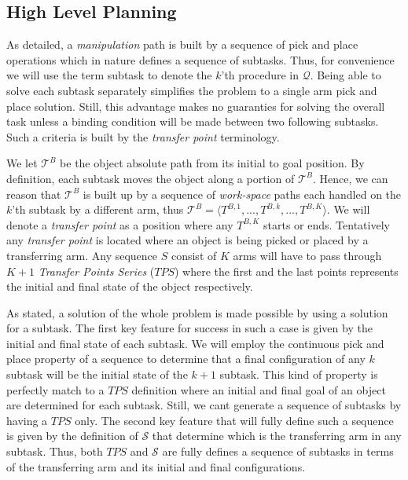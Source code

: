 \documentclass[english]{article}
\theoremstyle{definition}
\begin{document}
\subsection{High Level Planning}

As detailed, a \textit{manipulation} path is built by a sequence of pick and place operations which in nature defines a sequence of subtasks. Thus, for convenience we will use the term subtask to denote the $k$'th procedure in $\mathcal{Q}$. Being able to solve each subtask separately simplifies the problem to a single arm pick and place solution. Still, this advantage makes no guaranties for solving the overall task unless a binding condition will be made between two following subtasks. Such a criteria is built by the \textit{transfer point} terminology.  

We let $\mathcal{T}^B$ be the object absolute path from its initial to goal position. By definition, each subtask moves the object along a portion of $\mathcal{T}^B$. Hence, we can reason that $\mathcal{T}^B$ is built up by a sequence of \textit{work-space} paths each handled on the $k$'th subtask by a different arm, thus $\mathcal{T}^B = \langle T^{B,1},...,T^{B,k},...,T^{B,K} \rangle $. We will denote a \textit{transfer point} as a position where any $T^{B,K}$ starts or ends. Tentatively any \textit{transfer point} is located where an object is being picked or placed by a transferring arm. Any sequence $S$ consist of $K$ arms will have to pass through $K+1$ \textit{Transfer Points Series} ($TPS$) where the first and the last points represents the initial and final state of the object respectively. 

As stated, a solution of the whole problem is made possible by using a solution for a subtask. The first key feature for success in such a case is given by the initial and final state of each subtask. We will employ the continuous pick and place property of a sequence to determine that a final configuration of any $k$ subtask will be the initial state of the $k+1$ subtask. This kind of property is perfectly match to a $TPS$ definition where an initial and final goal of an object are determined for each subtask. Still, we cant generate a sequence of subtasks by having a $TPS$ only. The second key feature that will fully define such a sequence is given by the definition of $\mathcal{S}$ that determine which is the transferring arm in any subtask. Thus, both $TPS$ and $\mathcal{S}$ are fully defines a sequence of subtasks in terms of the transferring arm and its initial and final configurations. 
\end{document}
